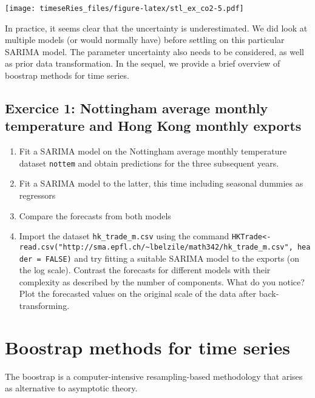 \documentclass[]{book}
\providecommand{\tightlist}{%
  \setlength{\itemsep}{0pt}\setlength{\parskip}{0pt}}
\begin{document}
\texttt{[image: timeseRies\_files/figure-latex/stl\_ex\_co2-5.pdf]}

In practice, it seems clear that the uncertainty is underestimated. We
did look at multiple models (or would normally have) before settling on
this particular SARIMA model. The parameter uncertainty also needs to be
considered, as well as prior data transformation. In the sequel, we
provide a brief overview of boostrap methods for time series.

\hypertarget{exercice-1-nottingham-average-monthly-temperature-and-hong-kong-monthly-exports}{%
\subsection{Exercice 1: Nottingham average monthly temperature and Hong
Kong monthly
exports}\label{exercice-1-nottingham-average-monthly-temperature-and-hong-kong-monthly-exports}}

\begin{enumerate}
\def\labelenumi{\arabic{enumi}.}
\tightlist
\item
  Fit a SARIMA model on the Nottingham average monthly temperature
  dataset \texttt{nottem} and obtain predictions for the three
  subsequent years.
\item
  Fit a SARIMA model to the latter, this time including seasonal dummies
  as regressors
\item
  Compare the forecasts from both models
\item
  Import the dataset \texttt{hk\_trade\_m.csv} using the command
  \texttt{HKTrade\textless{}-read.csv("http://sma.epfl.ch/\textasciitilde{}lbelzile/math342/hk\_trade\_m.csv",\ header\ =\ FALSE)}
  and try fitting a suitable SARIMA model to the exports (on the log
  scale). Contrast the forecasts for different models with their
  complexity as described by the number of components. What do you
  notice? Plot the forecasted values on the original scale of the data
  after back-transforming.
\end{enumerate}

\hypertarget{boostrap-methods-for-time-series}{%
\section{Boostrap methods for time
series}\label{boostrap-methods-for-time-series}}

The boostrap is a computer-intensive resampling-based methodology that
arises as alternative to asymptotic theory.
\end{document}
